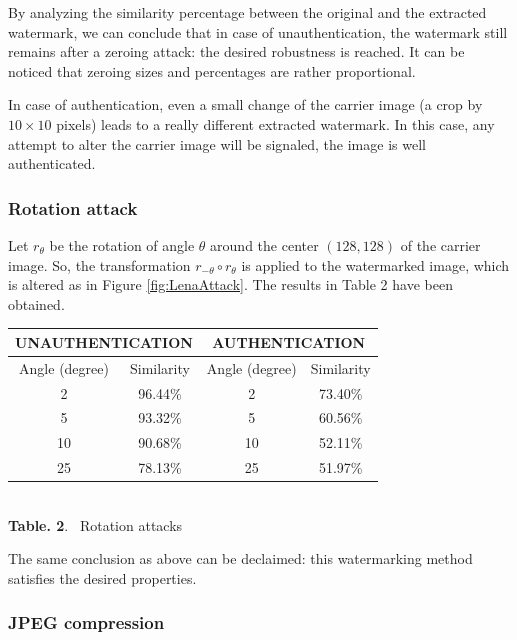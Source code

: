 By analyzing the similarity percentage between the original and the
extracted watermark, we can conclude that in case of unauthentication, the
watermark still remains after a zeroing attack: the desired robustness is
reached. It can be noticed that zeroing sizes and percentages are rather
proportional.

In case of authentication, even a small change of the carrier image (a crop
by $10\times 10$ pixels) leads to a really different extracted watermark.
In this case, any attempt to alter the carrier image will be signaled, the
image is well authenticated.

\subsubsection{Rotation attack}

Let $r_{\theta }$ be the rotation of angle $\theta $ around the center $%
(128, 128)$ of the carrier image. So, the transformation $r_{-\theta }\circ
r_{\theta }$ is applied to the watermarked image, which is altered as in Figure \ref{fig:LenaAttack}. The results in Table 2 have been obtained.


\begin{center}
\begin{footnotesize}
\begin{tabular}{|c|c||c|c|}
\hline
\multicolumn{2}{|c||}{UNAUTHENTICATION}  & \multicolumn{2}{c|}{AUTHENTICATION}\\ 
\hline
Angle (degree) & Similarity & Angle (degree) & Similarity \\
 \hline
2 & 96.44\% & 2 & 73.40\% \\
5 & 93.32\% & 5 & 60.56\% \\
10 & 90.68\% & 10 & 52.11\% \\
25 & 78.13\% & 25 & 51.97\% \\
\hline
\end{tabular}
\end{footnotesize}\\
\vspace{0.5cm}
\textbf{Table. 2}. ~Rotation attacks

\end{center}




The same conclusion as above can be declaimed: this watermarking method
satisfies the desired properties.

\subsubsection{JPEG compression}

